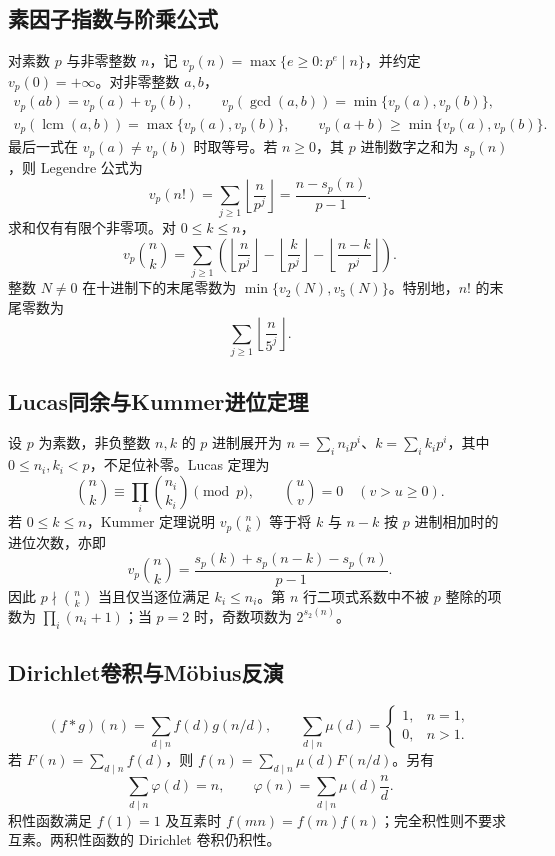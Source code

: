 \documentclass[../main.tex]{subfiles}
\begin{document}
\subsection{素因子指数与阶乘公式}
对素数 $p$ 与非零整数 $n$，记 $v_p(n)=\max\{e\ge0:p^e\mid n\}$，并约定 $v_p(0)=+\infty$。对非零整数 $a,b$，
\begin{gather*}
v_p(ab)=v_p(a)+v_p(b),\qquad
v_p(\gcd(a,b))=\min\{v_p(a),v_p(b)\},\\
v_p(\operatorname{lcm}(a,b))=\max\{v_p(a),v_p(b)\},\qquad
v_p(a+b)\ge\min\{v_p(a),v_p(b)\}.
\end{gather*}
最后一式在 $v_p(a)\ne v_p(b)$ 时取等号。若 $n\ge0$，其 $p$ 进制数字之和为 $s_p(n)$，则 Legendre 公式为
\[
v_p(n!)=\sum_{j\ge1}\left\lfloor\frac{n}{p^j}\right\rfloor
=\frac{n-s_p(n)}{p-1}.
\]
求和仅有有限个非零项。对 $0\le k\le n$，
\[
v_p\binom nk=\sum_{j\ge1}\left(
\left\lfloor\frac n{p^j}\right\rfloor-
\left\lfloor\frac k{p^j}\right\rfloor-
\left\lfloor\frac{n-k}{p^j}\right\rfloor\right).
\]
整数 $N\ne0$ 在十进制下的末尾零数为 $\min\{v_2(N),v_5(N)\}$。特别地，$n!$ 的末尾零数为
\[
\sum_{j\ge1}\left\lfloor\frac n{5^j}\right\rfloor.
\]

\subsection{Lucas同余与Kummer进位定理}
设 $p$ 为素数，非负整数 $n,k$ 的 $p$ 进制展开为 $n=\sum_i n_ip^i$、$k=\sum_i k_ip^i$，其中 $0\le n_i,k_i<p$，不足位补零。Lucas 定理为
\[
\binom nk\equiv\prod_i\binom{n_i}{k_i}\pmod p,
\qquad\binom uv=0\quad(v>u\ge0).
\]
若 $0\le k\le n$，Kummer 定理说明 $v_p\binom nk$ 等于将 $k$ 与 $n-k$ 按 $p$ 进制相加时的进位次数，亦即
\[
v_p\binom nk=\frac{s_p(k)+s_p(n-k)-s_p(n)}{p-1}.
\]
因此 $p\nmid\binom nk$ 当且仅当逐位满足 $k_i\le n_i$。第 $n$ 行二项式系数中不被 $p$ 整除的项数为 $\prod_i(n_i+1)$；当 $p=2$ 时，奇数项数为 $2^{s_2(n)}$。
\subsection{Dirichlet卷积与Möbius反演}
\[
(f*g)(n)=\sum_{d\mid n}f(d)g(n/d),\qquad
\sum_{d\mid n}\mu(d)=\begin{cases}1,&n=1,\\0,&n>1.\end{cases}
\]
若 $F(n)=\sum_{d\mid n}f(d)$，则 $f(n)=\sum_{d\mid n}\mu(d)F(n/d)$。另有
\[
\sum_{d\mid n}\varphi(d)=n,\qquad
\varphi(n)=\sum_{d\mid n}\mu(d)\frac nd.
\]
积性函数满足 $f(1)=1$ 及互素时 $f(mn)=f(m)f(n)$；完全积性则不要求互素。两积性函数的 Dirichlet 卷积仍积性。
\end{document}
